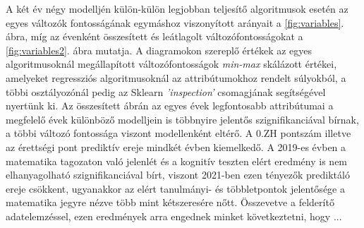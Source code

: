 \documentclass[12pt]{article}
\begin{document}
A két év négy modelljén külön-külön legjobban teljesítő algoritmusok esetén az egyes változók fontosságának egymáshoz viszonyított arányait a \ref{fig:variables}. ábra, míg az évenként összesített és leátlagolt változófontosságokat a \ref{fig:variables2}. ábra mutatja. A diagramokon szereplő értékek az egyes algoritmusoknál megállapított változófontosságok \textit{min-max} skálázott értékei, amelyeket regressziós algoritmusoknál az attribútumokhoz rendelt súlyokból, a többi osztályozónál pedig az Sklearn \textit{'inspection'} csomagjának segítségével nyertünk ki. Az összesített ábrán az egyes évek legfontosabb attribútumai a megfelelő évek különböző modelljein is többnyire jelentős szignifikanciával bírnak, a többi változó fontossága viszont modellenként eltérő. A 0.ZH pontszám illetve az érettségi pont prediktív ereje mindkét évben kiemelkedő. A 2019-es évben a matematika tagozaton való jelenlét és a kognitív teszten elért eredmény is nem elhanyagolható szignifikanciával bírt, viszont 2021-ben ezen tényezők prediktáló ereje csökkent, ugyanakkor az elért tanulmányi- és többletpontok jelentősége a matematika jegyre nézve több mint kétszeresére nőtt. Összevetve a felderítő adatelemzéssel, ezen eredmények arra engednek minket következtetni, hogy  ...


\newpage
\end{document}
